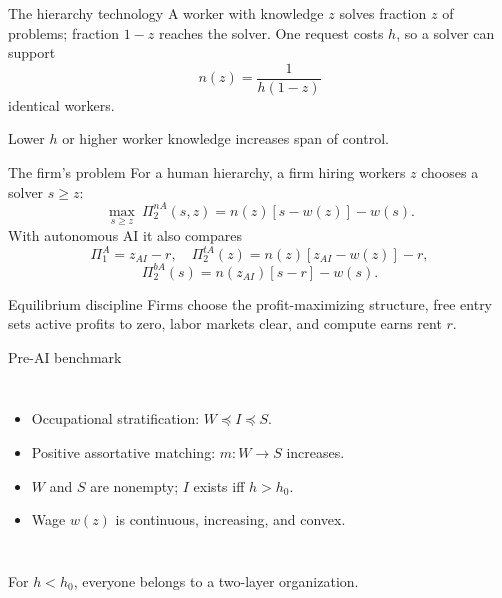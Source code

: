 \documentclass[aspectratio=169,10pt]{beamer}
\begin{document}
\begin{frame}{The hierarchy technology}
\small
A worker with knowledge $z$ solves fraction $z$ of problems; fraction $1-z$ reaches the solver. One request costs $h$, so a solver can support
\[
\boxed{n(z)=\frac{1}{h(1-z)}}
\]
identical workers.
\begin{center}
\end{center}
Lower $h$ or higher worker knowledge increases span of control.
\end{frame}

\begin{frame}{The firm's problem}
\small
For a human hierarchy, a firm hiring workers $z$ chooses a solver $s\ge z$:
\[
\max_{s\ge z}\ \Pi^{nA}_2(s,z)=n(z)[s-w(z)]-w(s).
\]
With autonomous AI it also compares
\[
\Pi_1^A=z_{AI}-r,
\quad \Pi_2^{tA}(z)=n(z)[z_{AI}-w(z)]-r,
\]
\[
\Pi_2^{bA}(s)=n(z_{AI})[s-r]-w(s).
\]
\begin{block}{Equilibrium discipline}
Firms choose the profit-maximizing structure, free entry sets active profits to zero, labor markets clear, and compute earns rent $r$.
\end{block}
\end{frame}

\begin{frame}{Pre-AI benchmark}
\small
\begin{columns}[T,onlytextwidth]
\begin{itemize}
\item Occupational stratification: $W\preceq I\preceq S$.
\item Positive assortative matching: $m:W\to S$ increases.
\item $W$ and $S$ are nonempty; $I$ exists iff $h>h_0$.
\item Wage $w(z)$ is continuous, increasing, and convex.
\end{itemize}
\end{columns}
\vfill
For $h<h_0$, everyone belongs to a two-layer organization.
\end{frame}
\end{document}
